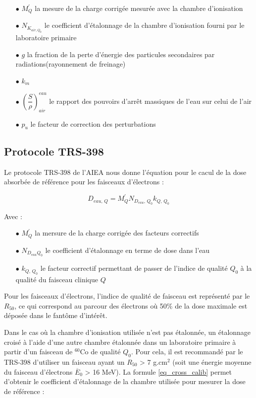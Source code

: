 \documentclass{article}
\begin{document}
\begin{itemize}
  \item[$\bullet$] $M_Q^{'}$ la mesure de la charge corrigée mesurée avec la chambre d'ionisation 
  \item[$\bullet$] $N_{K_{air, Q_0}}$ le coefficient d'étalonnage de la chambre d'ionisation fourni par le laboratoire primaire
  \item[$\bullet$] $g$ la fraction de la perte d'énergie des particules secondaires par radiations(rayonnement de freinage)
  \item[$\bullet$] $k_m$ 
  \item[$\bullet$] $\left( \dfrac{S}{\rho} \right)^{eau}_{air}$ le rapport des pouvoirs d'arrêt massiques de l'eau sur celui de l'air
  \item[$\bullet$] $p_u$ le facteur de correction des perturbations
\end{itemize}

\subsection{Protocole TRS-398}

Le protocole TRS-398 de l'AIEA \cite{international2001iaea} nous donne l'équation pour le cacul de la dose absorbée de référence pour les faisceaux d'électrons :

\begin{equation}
  D_{eau, \, Q} = M_Q^{'} N_{D_{eau}, \, Q_0} k_{Q,\, Q_0}
  \label{eq_dose_398}
\end{equation}

Avec :
\begin{itemize}
  \item[$\bullet$] $M_Q^{'}$ la mersure de la charge corrigée des facteurs correctifs
  \item[$\bullet$] $N_{D_{eau} Q_0}$ le coefficient d'étalonnage en terme de dose dans l'eau
  \item[$\bullet$] $k_{Q,\, Q_0}$ le facteur correctif permettant de passer de l'indice de qualité $Q_0$ à la qualité du faisceau clinique $Q$
\end{itemize}

Pour les faisceaux d'électrons, l'indice de qualité de faisceau est représenté par le $R_{50}$, ce qui correspond au parcour des électrons où 50\% de la dose maximale est déposée dans le fantôme d'intérêt.

Dans le cas où la chambre d'ionisation utilisée n'est pas étalonnée, un étalonnage croisé à l'aide d'une autre chambre étalonnée dans un laboratoire primaire à partir d'un faisceau de $^{60}$Co de qualité $Q_0$. Pour cela, il est recommandé par le TRS-398 d'utiliser un faisceau ayant un $R_{50}$ > 7 g.cm$^2$ (soit une énergie moyenne du faisceau d'électrons $\overline{E}_0$ > 16 MeV). La formule \ref*{eq_cross_calib} permet d'obtenir le coefficient d'étalonnage de la chambre utilisée pour mesurer la dose de référence :
\end{document}
